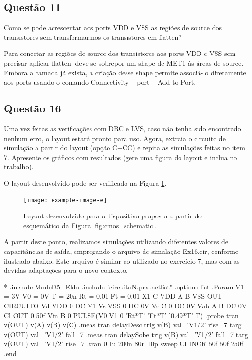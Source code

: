 \documentclass[12pt,a4paper]{article}
\begin{document}
\subsection*{Questão 11}

Como se pode acrescentar aos ports VDD e VSS as regiões de source dos transistores sem transformarmos os transistores em flatten?

Para conectar as regiões de source dos transistores aos ports VDD e VSS sem precisar aplicar flatten, deve-se sobrepor um shape de MET1 às áreas de source. Embora a camada já exista, a criação desse shape permite associá-lo diretamente aos ports usando o comando Connectivity -- port -- Add to Port.

\subsection*{Questão 16}

Uma vez feitas as verificações com DRC e LVS, caso não tenha sido encontrado nenhum erro, o layout estará pronto para uso. Agora, extraia o circuito de simulação a partir do layout (opção C+CC) e repita as simulações feitas no item 7. Apresente os gráficos com resultados (gere uma figura do layout e inclua no trabalho).

O layout desenvolvido pode ser verificado na Figura \ref{fig:layout_developed}.

\begin{figure}[H]
    \centering
    \texttt{[image: example-image-e]}
    \caption{Layout desenvolvido para o dispositivo proposto a partir do esquemático da Figura \ref{fig:cmos_schematic}.}
    \label{fig:layout_developed}
\end{figure}

A partir deste ponto, realizamos simulações utilizando diferentes valores de capacitâncias de saída, empregando o arquivo de simulação Ex16.cir, conforme ilustrado abaixo. Este arquivo é similar ao utilizado no exercício 7, mas com as devidas adaptações para o novo contexto.

\begin{codeblock}[title={Exemplo de Simulação}, label={lst:simulation_example}, listing options={language=TeX}]
*
.include Model35_Eldo
.include "circuitoN.pex.netlist"
.options list
.Param V1 = 3V V0 = 0V T = 20n Rt = 0.01 Ft = 0.01
X1 C VDD A B VSS OUT CIRCUITO
Vd VDD 0 DC V1
Vs VSS 0 DC 0V
Vc C 0 DC 0V
Vab A B DC 0V
Cl OUT 0 50f
Vin B 0 PULSE(V0 V1 0 'Rt*T' 'Ft*T' '0.49*T' T)
.probe tran v(OUT) v(A) v(B) v(C)
.meas tran delayDesc trig v(B) val='V1/2' rise=7 targ v(OUT) val='V1/2'
fall=7
.meas tran delaySobe trig v(B) val='V1/2' fall=7 targ v(OUT) val='V1/2'
rise=7
.tran 0.1u 200n 80n 10p sweep Cl INCR 50f 50f 250f
.end
\end{codeblock}
\end{document}
